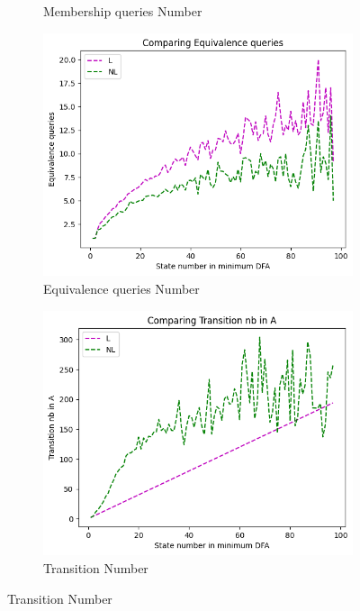 \begin{figure}[!htb]
\begin{subfigure}[b]{0.3\textwidth}
    \caption{Membership queries Number}
    \label{fig:MemberBenchMarkCompare}
  \end{subfigure}
  \begin{subfigure}[b]{0.3\textwidth}
    \includegraphics[width=\textwidth]{../statistics/plots/BenchMark/Equivalence queries.png}
    \caption{Equivalence queries Number}
    \label{fig:EquivBenchMarkCompare}
  \end{subfigure}
  \begin{subfigure}[b]{0.3\textwidth}
    \includegraphics[width=\textwidth]{../statistics/plots/BenchMark/Transition nb in A.png}
    \caption{Transition Number}
    \label{fig:TransitionBenchMarkCompare}

\end{subfigure}
\end{figure}

